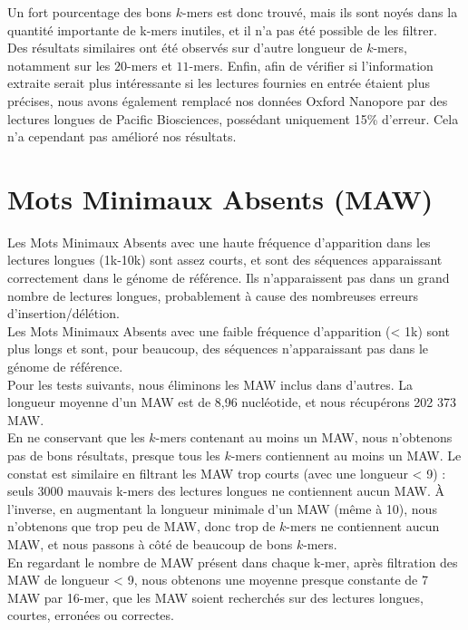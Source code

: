 \documentclass{report}
\begin{document}
      Un fort pourcentage des bons $k$-mers est donc trouvé, mais ils sont noyés dans la quantité importante de k-mers inutiles, et il n'a pas été possible de les filtrer.\\

      Des résultats similaires ont été observés sur d'autre longueur de $k$-mers, notamment sur les $20$-mers et $11$-mers. Enfin, afin de vérifier si l'information extraite serait plus intéressante si les lectures fournies en entrée étaient plus précises, nous avons également remplacé nos données Oxford Nanopore par des lectures longues de Pacific Biosciences, possédant uniquement 15\% d'erreur. Cela n'a cependant pas amélioré nos résultats.

    \section{Mots Minimaux Absents (MAW)}
      Les Mots Minimaux Absents avec une haute fréquence d’apparition dans les lectures longues (1k-10k) sont assez courts, et sont des séquences apparaissant correctement dans le génome de référence. Ils n'apparaissent pas dans un grand nombre de lectures longues, probablement à cause des nombreuses erreurs d'insertion/délétion.\\

      Les Mots Minimaux Absents avec une faible fréquence d’apparition (< 1k) sont plus longs et sont, pour beaucoup, des séquences n’apparaissant pas dans le génome de référence.\\

      Pour les tests suivants, nous éliminons les MAW inclus dans d’autres. La longueur moyenne d'un MAW est de 8,96 nucléotide, et nous récupérons 202 373 MAW.\\

      En ne conservant que les $k$-mers contenant au moins un MAW, nous n'obtenons pas de bons résultats, presque tous les $k$-mers contiennent au moins un MAW. Le constat est similaire en filtrant les MAW trop courts (avec une longueur < 9) : seuls 3000 mauvais k-mers des lectures longues ne contiennent aucun MAW. À l'inverse, en augmentant la longueur minimale d'un MAW (même à 10), nous n'obtenons que trop peu de MAW, donc trop de $k$-mers ne contiennent aucun MAW, et nous passons à côté de beaucoup de bons $k$-mers.\\

      En regardant le nombre de MAW présent dans chaque k-mer, après filtration des MAW de longueur < 9, nous obtenons une moyenne presque constante de 7 MAW par 16-mer, que les MAW soient recherchés sur des lectures longues, courtes, erronées ou correctes.\\
\end{document}
